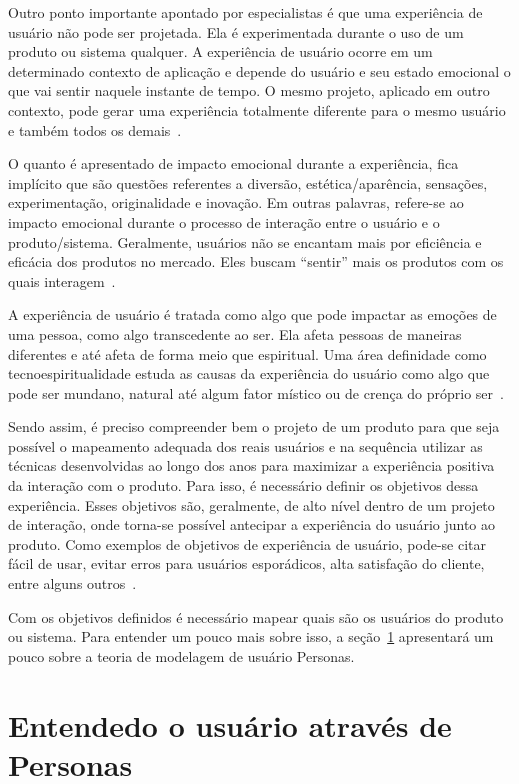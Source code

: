 Outro ponto importante apontado por especialistas é que uma experiência de usuário não pode ser projetada. Ela é experimentada durante o uso de um produto ou sistema qualquer. A experiência de usuário ocorre em um determinado contexto de aplicação e depende do usuário e seu estado emocional o que vai sentir naquele instante de tempo. O mesmo projeto, aplicado em outro contexto, pode gerar uma experiência totalmente diferente para o mesmo usuário e também todos os demais~\cite{hartson:2012}.

O quanto é apresentado de impacto emocional durante a experiência, fica implícito que são questões referentes a diversão, estética/aparência, sensações, experimentação, originalidade e inovação. Em outras palavras, refere-se ao impacto emocional durante o processo de interação entre o usuário e o produto/sistema. Geralmente, usuários não se encantam mais por eficiência e eficácia dos produtos no mercado. Eles buscam ``sentir'' mais os produtos com os quais interagem~\cite{hartson:2012}.

A experiência de usuário é tratada como algo que pode impactar as emoções de uma pessoa, como algo transcedente ao ser. Ela afeta pessoas de maneiras diferentes e até afeta de forma meio que espiritual. Uma área definidade como tecnoespiritualidade estuda as causas da experiência do usuário como algo que pode ser mundano, natural até algum fator místico ou de crença do próprio ser~\cite{hartson:2012}.

Sendo assim, é preciso compreender bem o projeto de um produto para que seja possível o mapeamento adequada dos reais usuários e na sequência utilizar as técnicas desenvolvidas ao longo dos anos para maximizar a experiência positiva da interação com o produto. Para isso, é necessário definir os objetivos dessa experiência. Esses objetivos são, geralmente, de alto nível dentro de um projeto de interação, onde torna-se possível antecipar a experiência do usuário junto ao produto. Como exemplos de objetivos de experiência de usuário, pode-se citar fácil de usar, evitar erros para usuários esporádicos, alta satisfação do cliente, entre alguns outros~\cite{hartson:2012}.

Com os objetivos definidos é necessário mapear quais são os usuários do produto ou sistema. Para entender um pouco mais sobre isso, a seção~\ref{sec:personas} apresentará um pouco sobre a teoria de modelagem de usuário Personas.

\section{Entendedo o usuário através de Personas}
\label{sec:personas}


